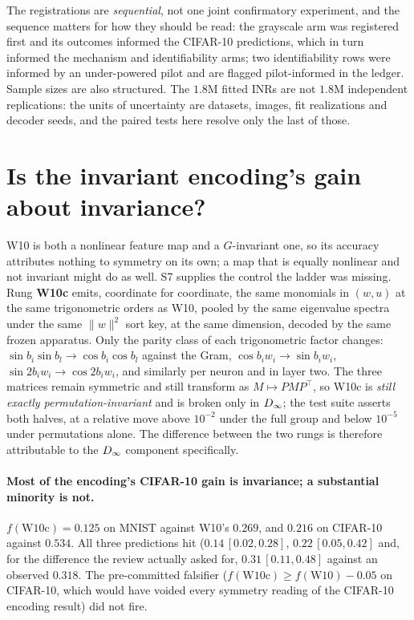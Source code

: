 The registrations are \emph{sequential}, not one joint confirmatory experiment, and the sequence
matters for how they should be read: the grayscale arm was registered first and its outcomes
informed the CIFAR-10 predictions, which in turn informed the mechanism and identifiability arms;
two identifiability rows were informed by an under-powered pilot and are flagged pilot-informed in
the ledger. Sample sizes are also structured. The $1.8$M fitted INRs are not $1.8$M independent
replications: the units of uncertainty are datasets, images, fit realizations and decoder seeds,
and the paired tests here resolve only the last of those.




\section{Is the invariant encoding's gain about invariance?}\label{app:control}\label{sec:control}

W10 is both a nonlinear feature map and a $G$-invariant one, so its accuracy attributes nothing to
symmetry on its own; a map that is equally nonlinear and not invariant might do as well. S7 supplies
the control the ladder was missing. Rung \textbf{W10c} emits, coordinate for coordinate, the same
monomials in $(w,u)$ at the same trigonometric orders as W10, pooled by the same eigenvalue spectra
under the same $\|w\|^2$ sort key, at the same dimension, decoded by the same frozen apparatus. Only
the parity class of each trigonometric factor changes: $\sin b_i \sin b_l \to \cos b_i \cos b_l$
against the Gram, $\cos b_i w_i \to \sin b_i w_i$, $\sin 2b_i w_i \to \cos 2b_i w_i$, and similarly
per neuron and in layer two. The three matrices remain symmetric and still transform as
$M \mapsto PMP^\top$, so W10c is \emph{still exactly permutation-invariant} and is broken only in
$D_\infty$; the test suite asserts both halves, at a relative move above $10^{-2}$ under the full group
and below $10^{-5}$ under permutations alone. The difference between the two rungs is therefore
attributable to the $D_\infty$ component specifically.



\paragraph{Most of the encoding's CIFAR-10 gain is invariance; a substantial minority is not.}
$f(\mathrm{W10c}) = 0.125$ on MNIST against W10's $0.269$, and $0.216$ on CIFAR-10 against
$0.534$. All three predictions hit ($0.14\,[0.02,0.28]$, $0.22\,[0.05,0.42]$ and, for
the difference the review actually asked for, $0.31\,[0.11,0.48]$ against an observed $0.318$. The
pre-committed falsifier ($f(\mathrm{W10c}) \ge f(\mathrm{W10}) - 0.05$ on CIFAR-10, which would
have voided every symmetry reading of the CIFAR-10 encoding result) did not fire.

